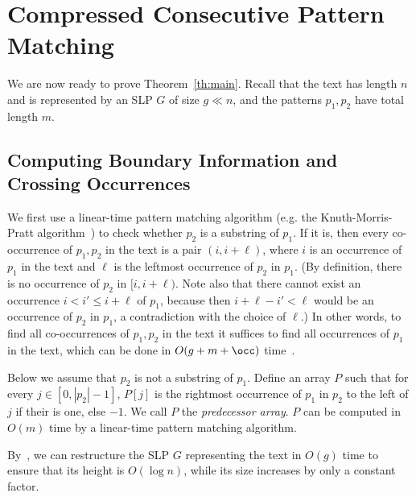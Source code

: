  
\section{Compressed Consecutive Pattern Matching}
\label{pmgapped:sec:consec}
We are now ready to prove Theorem~\ref{th:main}. Recall that the text has length $n$ and is represented by an SLP $G$ of size $g \ll n$, and the patterns $p_1,p_2$ have total length $m$.

\subsection{Computing Boundary Information and Crossing Occurrences}
\label{pmgapped:sec:boundary}
We first use a linear-time pattern matching algorithm (e.g. the Knuth-Morris-Pratt algorithm~\cite{KMP}) to check whether $p_2$ is a substring of $p_1$. If it is, then every co-occurrence of $p_1, p_2$ in the text is a pair $(i,i+\ell)$, where $i$ is an occurrence of $p_1$ in the text and $\ell$ is the leftmost occurrence of $p_2$ in $p_1$. (By definition, there is no occurrence of $p_2$ in $[i,i+\ell)$. Note also that there cannot exist an occurrence $i < i' \le i+\ell$ of $p_1$, because then $i+\ell-i' < \ell$ would be an occurrence of $p_2$ in $p_1$, a contradiction with the choice of $\ell$.) In other words, to find all co-occurrences of $p_1,p_2$ in the text it suffices to find all occurrences of $p_1$ in the text, which can be done in $O(g+m+\occ)$ time~\cite{DBLP:conf/soda/GanardiG22}.

Below we assume that $p_2$ is not a substring of $p_1$. Define an array $P$ such that for every $j \in [0, |p_2|-1]$, $P[j]$ is the rightmost occurrence of $p_1$ in $p_2$ to the left of $j$ if their is one, else $-1$. We call $P$ the \emph{predecessor array}. $P$ can be computed in $O(m)$ time by a linear-time pattern matching algorithm.

By~\cite{DBLP:conf/focs/GanardiJL19}, we can restructure the SLP $G$ representing the text in $O(g)$ time to ensure that its height is $O(\log n)$, while its size increases by only a constant factor. 

